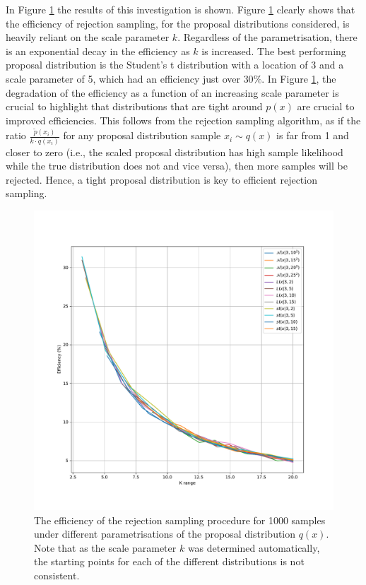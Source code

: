 \documentclass{article}
\begin{document}
	In Figure \ref{fig:Q1_rejection_sampling_dists} the results of this investigation is shown. Figure \ref{fig:Q1_rejection_sampling_dists} clearly shows that the efficiency of rejection sampling, for the proposal distributions considered, is heavily reliant on the scale parameter $k$. Regardless of the parametrisation, there is an exponential decay in the efficiency as $k$ is increased. The best performing proposal distribution is the Student's t distribution with a location of 3 and a scale parameter of 5, which had an efficiency just over $30\%$. In Figure \ref{fig:Q1_rejection_sampling_dists}, the degradation of the efficiency as a function of an increasing scale parameter is crucial to highlight that distributions that are tight around $p(x)$ are crucial to improved efficiencies. This follows from the rejection sampling algorithm, as if the ratio $\frac{\tilde{p}(x_i)}{k \cdot q(x_i)}$ for any proposal distribution sample $x_i \sim q(x)$ is far from 1 and closer to zero (i.e., the scaled proposal distribution has high sample likelihood while the true distribution does not and vice versa), then more samples will be rejected. Hence, a tight proposal distribution is key to efficient rejection sampling.
	\begin{figure}[htb!]
		\centering
		\includegraphics[scale=0.5]{Q1c.pdf}
		\caption{The efficiency of the rejection sampling procedure for 1000 samples under different parametrisations of the proposal distribution $q(x)$. Note that as the scale parameter $k$ was determined automatically, the starting points for each of the different distributions is not consistent.}
		\label{fig:Q1_rejection_sampling_dists}
	\end{figure}
\end{document}
